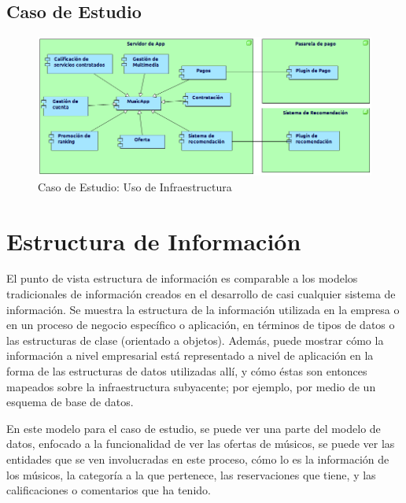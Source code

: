 \subsection{Caso de Estudio}

\begin{figure}[h!]
	\centering
	\includegraphics[width=\linewidth]{Arquitectura/Tecnologia/imgs/uso2.png}
	\caption{Caso de Estudio: Uso de Infraestructura}
\end{figure}

\newpage

\section{Estructura de Información}
El punto de vista estructura de información es comparable a los modelos tradicionales de información creados en el desarrollo de casi cualquier sistema de información. Se muestra la estructura de la información utilizada en la empresa o en un proceso de negocio específico o aplicación, en términos de tipos de datos o las estructuras de clase (orientado a objetos). Además, puede mostrar cómo la información a nivel empresarial está representado a nivel de aplicación en la forma de las estructuras de datos utilizadas allí, y cómo éstas son entonces mapeados sobre la infraestructura subyacente; por ejemplo, por medio de un esquema de base de datos. \cite{ArchiMat55:online} \vspace{\baselineskip}

En este modelo para el caso de estudio, se puede ver una parte del modelo de datos, enfocado a la funcionalidad de ver las ofertas de músicos, se puede ver las entidades que se ven involucradas en este proceso, cómo lo es la información de los músicos, la categoría a la que pertenece, las reservaciones que tiene, y las calificaciones o comentarios que ha tenido.

